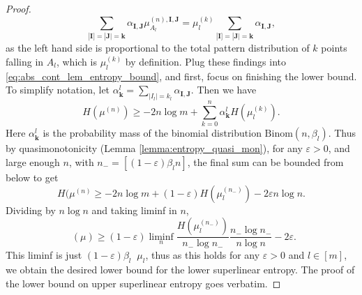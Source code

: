 \documentclass[11pt]{article}
\newcommand{\lowersupent}{\mathop{\underline{H}^{\mathrm{superlin}}}}
\theoremstyle{definition}
\begin{document}
\begin{proof}
    $$\sum_{|\mathbf{I}]=|\mathbf{J}|=\mathbf{k}}\alpha_{\mathbf{I}, \mathbf{J}}\mu_{A_l}^{(n),\mathbf{I}, \mathbf{J}}=\mu_l^{(k)}\sum_{|\mathbf{I}]=|\mathbf{J}|=\mathbf{k}}\alpha_{\mathbf{I}, \mathbf{J}},$$
    as the left hand side is proportional to the total pattern distribution of $k$ points falling in $A_l$, which is $\mu_l^{(k)}$ by definition. 
    Plug these findings into \eqref{eq:abs_cont_lem_entropy_bound}, and first, focus on finishing the lower bound. To simplify notation, let $\alpha_{\mathbf{k}}^l = \sum_{|I_l|=k_l}\alpha_{\mathbf{I}, \mathbf{J}}$.
    Then we have
    \begin{equation} \label{eq:abs_cont_lem_entropy_bound_simp}
        H(\mu^{(n)})\geq -2n\log m + \sum_{k=0}^n \alpha_{\mathbf{k}}^lH(\mu_l^{(k)}).
    \end{equation}
    Here $\alpha_{\mathbf{k}}^l$ is the probability mass of the binomial distribution $\mathrm{Binom}(n, \beta_l)$. Thus by quasimonotonicity (Lemma \ref{lemma:entropy_quasi_mon}), for any $\varepsilon>0$, and large enough $n$, with $n_{-}=\left[(1-\varepsilon)\beta_l n\right]$, the final sum can be bounded from below to get
    $$H(\mu^{(n)}\geq-2n\log m + (1-\varepsilon)H(\mu_l^{(n_{-})})-2\varepsilon n\log n.$$
    Dividing by $n\log n$ and taking liminf in $n$,
    $$\lowersupent(\mu)\geq (1-\varepsilon)\liminf_n \frac{H(\mu_l^{(n_{-})})}{n_{-}\log n_{-}} \frac{n_{-}\log n_{-}}{n\log n}-2\varepsilon. $$
    This liminf is just $(1-\varepsilon)\beta_l\lowersupent{\mu_l}$, thus as this holds for any $\varepsilon>0$ and $l\in[m]$, we obtain the desired lower bound for the lower superlinear entropy. The proof of the lower bound on upper superlinear entropy goes verbatim. 


\end{proof}
\end{document}
